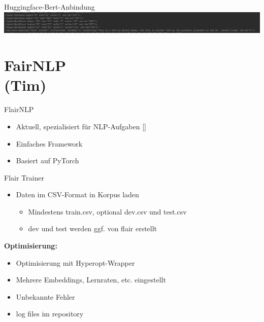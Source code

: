 \documentclass[xcolor=table]{beamer}
\begin{document}
\begin{frame}[t]{Huggingface-Bert-Anbindung}\vspace{10pt}
	\hspace*{-1cm}
	\includegraphics[scale=.25]{einbindung.png}	
\end{frame}


\section{FairNLP\\(Tim)}
\begin{frame}[t]{FlairNLP}\vspace{10pt}
\begin{itemize}
\item Aktuell, spezialisiert für NLP-Aufgaben [\cite{flair}]
\item Einfaches Framework
\item Basiert auf PyTorch
\end{itemize}
\end{frame}

\begin{frame}[t]{Flair Trainer}\vspace{10pt}
\begin{itemize}
\item Daten im CSV-Format in Korpus laden
\begin{itemize}
\item Mindestens train.csv, optional dev.csv und test.csv
\item dev und test werden ggf. von flair erstellt
\end{itemize}
\end{itemize}
\textbf{Optimisierung:}
\begin{itemize}
\item Optimisierung mit Hyperopt-Wrapper
\item Mehrere Embeddings, Lernraten, etc. eingestellt
\item Unbekannte Fehler
\item log files im repository
\end{itemize}
\end{frame}
\end{document}
